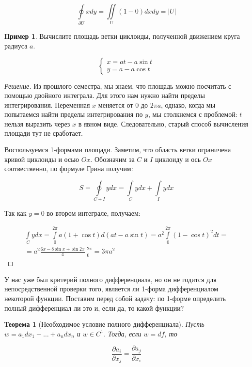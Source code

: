\documentclass[a5paper]{article}
\newcounter{through}
\theoremstyle{plain}
\newtheorem{theorem}[through]{Теорема}
\theoremstyle{definition}
\newtheorem{example}[through]{Пример}
\numberwithin{through}{section}
\numberwithin{equation}{section}
\begin{document}
\begin{equation*}
	\oint\limits_{\partial U}xdy = \iint\limits_{U} (1 - 0)dxdy = |U|
\end{equation*}

\begin{example}
	Вычислите площадь ветки циклоиды, полученной движением круга радиуса $a$.
	
	\begin{equation*}
		\begin{cases}
			x = at-a\sin t \\
			y = a - a\cos t
		\end{cases}
	\end{equation*}
\end{example}

\begin{proof}[Решение]
	Из прошлого семестра, мы знаем, что площадь можно посчитать с помощью двойного интеграла. Для этого нам нужно найти пределы интегрирования. Переменная $x$ меняется от $0$ до $2\pi a$, однако, когда мы попытаемся найти пределы интегрирования по $y$, мы столкнемся с проблемой: $t$ нельзя выразить через $x$ в явном виде. Следовательно, старый способ вычисления площади тут не сработает.
	
	Воспользуемся 1-формами площади. Заметим, что область ветки ограничена кривой циклоиды и осью $Ox$. Обозначим за $C$ и $I$ циклоиду и ось $Ox$ соотвественно, по формуле Грина получим:
	
	\begin{equation*}
		S = \oint\limits_{C + I}ydx =\int\limits_{C}ydx + \int\limits_{I}ydx
	\end{equation*}

	Так как $y = 0$ во втором интеграле, получаем:
	
	\begin{multline*}
	\int\limits_{C}ydx = \int\limits_{0}^{2\pi}a(1+\cos t) d(at - a\sin t) = a^2 \int\limits_{0}^{2\pi} (1-\cos t)^2dt = \\= a^2 \frac{6x - 8 \sin x + \sin 2x}{4} \bigg|_0^{2\pi} = 3 \pi a^2
	\end{multline*}
\end{proof}

У нас уже был критерий полного дифференциала, но он не годится для непосредственной проверки того, является ли 1-форма дифференциалом некоторой функции. Поставим перед собой задачу: по 1-форме определить полный дифференциал ли это и, если да, то какой функции?

\begin{theorem}[Необходимое условие полного дифференциала]
	Пусть $w = a_1 dx_1 + \ldots + a_n dx_n$ и $w \in C^1$. Тогда, если $w = df$, то 
	
	\begin{equation*}
		\frac{\partial a_i}{\partial x_j} = \frac{\partial a_j}{\partial x_i}
	\end{equation*}
\end{theorem}
\end{document}
